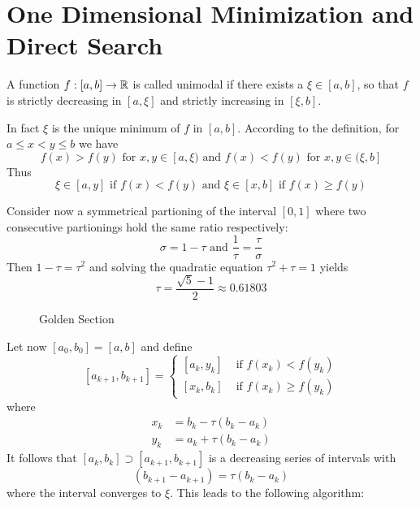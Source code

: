
\newpage
\section{One Dimensional Minimization and Direct Search}


\begin{definition}\label{def:unimodal_fnc}
A function \( f : [a,b] \to \mathbb{R} \) is called unimodal if there exists a \( \xi \in [a,b] \), so that
\( f \) is strictly decreasing in \( [a, \xi] \) and strictly increasing in \( [\xi, b] \).
\end{definition}
\bigskip

In fact \( \xi \) is the unique minimum of \( f \) in \( [a, b] \). According to the definition, 
for \( a \le x < y \le b \) we have 
\[
    f(x) > f(y) \text{ for } x, y \in [a, \xi) \text{ and } f(x) < f(y) \text{ for }  x, y \in (\xi, b]
\]
Thus
\[
    \xi \in [a, y] \text{ if } f(x) < f(y) \text{ and } \xi \in [x, b] \text{ if } f(x) \ge f(y)
\]

Consider now a symmetrical partioning of the interval \( [0, 1] \) where two consecutive partionings hold 
the same ratio respectively:
\[
     \sigma = 1 - \tau \text{ and } \frac{1}{\tau} = \frac{\tau}{\sigma}
\]
Then \( 1 - \tau = \tau^2 \) and solving the quadratic equation \( \tau^2 + \tau = 1 \) yields
\[ 
     \tau = \frac{\sqrt{5} - 1}{2} \approx 0.61803
\]
\bigskip

\begin{figure}[H]
    \centering
     \caption{Golden Section}\label{fig:golden_section} 
\end{figure}
\bigskip

Let now \( [a_0, b_0] = [a, b] \) and define 
\[  
    [a_{k + 1}, b_{k + 1}] = 
        \begin{cases}
            [a_k, y_k] & \text{ if } f(x_k) < f(y_k)  \\
            [x_k, b_k] & \text{ if } f(x_k) \ge f(y_k)
        \end{cases}
\]
where
\[
    \begin{split}
        x_k & = b_k - \tau (b_k - a_k) \\ 
        y_k & = a_k + \tau (b_k - a_k)
    \end{split}
\]
It follows that \( [a_k, b_k] \supset [a_{k + 1}, b_{k + 1}] \) is a decreasing series of intervals with
\[  
    (b_{k + 1} - a_{k + 1}) =  \tau(b_k - a_k)
\]
where the interval converges to \( \xi \). This leads to the following algorithm:
\bigskip

